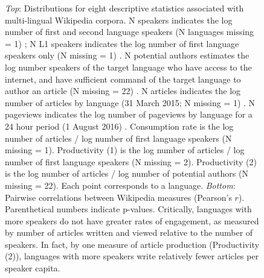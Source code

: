 \documentclass[9pt,twoside,lineno]{pnas-new}
\begin{document}
\begin{figure}
  \caption{{\it Top}: Distributions for eight descriptive statistics associated with multi-lingual Wikipedia corpora. N speakers indicates the log number of first and second language speakers (N languages missing = 1) \cite{wikispeakers}; N L1 speakers indicates the log number of first language speakers only (N missing = 1) \cite{amano2014global}. N potential authors estimates the log number speakers of the target language who have access to the internet, and have sufficient command of the target language to author an article (N  missing = 22) \cite{wikiproductivity}. N articles indicates the log number of articles by language (31 March 2015; N  missing = 1) \cite{wikispeakers}. N pageviews indicates the log number of pageviews by language for a 24 hour period (1 August 2016) \cite{wikipageview}. Consumption rate is the log number of articles / log number of first language speakers (N  missing = 1). Productivity (1) is the log number of articles / log number of first language speakers (N  missing = 2). Productivity (2) is the log number of articles / log number of potential authors (N  missing = 22). Each point corresponds to a language. {\it Bottom}: Pairwise correlations between Wikipedia measures (Pearson's $r$). Parenthetical numbers indicate p-values. Critically, languages with more speakers do not have greater rates of engagement, as measured by number of articles written and viewed relative to the number of speakers. In fact, by one measure of article production (Productivity (2)), languages with more speakers write relatively fewer articles per speaker capita.}
\end{figure}


\pagebreak
 \clearpage
\end{document}
